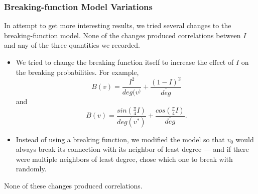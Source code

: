 \documentclass[a4paper,10pt]{article}
\begin{document}
\subsubsection{Breaking-function Model Variations}
In attempt to get more interesting results, we tried several changes to the breaking-function model. None of the changes produced correlations between $I$ and any of the three quantities we recorded.

\begin{itemize}

 \item We tried to change the breaking function itself to increase the effect of $I$ on the breaking probabilities. For example,
 \begin{equation}
  B(v) = \frac{I^2}{deg(v^)} + \frac{(1 - I)^2}{\overline{deg}}
 \end{equation}
and
 \begin{equation}
  B(v) = \frac{sin(\frac{\pi}{4}I)}{deg(v^*)} + \frac{cos(\frac{\pi}{4}I)}{\overline{deg}}.
 \end{equation}

 \item Instead of using a breaking function, we modified the model so that $v_0$ would always break its connection with its neighbor of least degree --- and if there were multiple neighbors of least degree, chose which one to break with randomly. 

\end{itemize}
 None of these changes produced correlations.
\end{document}
